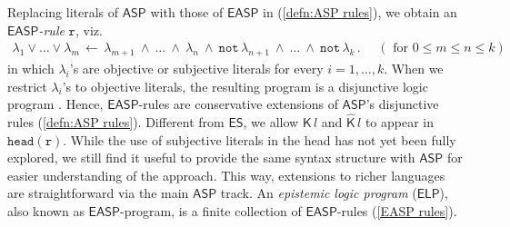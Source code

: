 \documentclass[submission,copyright,creativecommons]{eptcs}
\newcommand{\logic}[1]  { \ensuremath{\mathsf{#1}} }
\newcommand{\ASP}  { \logic{ASP} }
\newcommand{\ES}  { \logic{ES} }
\newcommand{\EASP}  { \logic{EASP} }
\newcommand{\ELP}  { \logic{ELP} }
\newcommand{\lpnot}  { \mathtt{not} \, }
\newcommand{\K}  { \mathsf{K} }
\newcommand{\Khat}  { \hat{\mathsf{K}} }
\begin{document}
Replacing literals of $\ASP$ with those of $\EASP$ in (\ref{defn:ASP rules}), we obtain
an \emph{$\EASP$-rule} $\mathtt{r}$, viz.\ 
\begin{align} \label{EASP rules}
\lambda_1 \lor \ldots \lor \lambda_m \,\leftarrow\, 
\lambda_{m+1} ~\land~ \ldots ~\land~ \lambda_n ~\land~
\lpnot \lambda_{n+1} ~\land~ \ldots ~\land~ \lpnot \lambda_k\,. ~~~~~~
(\text{ for } 0 \leq m \leq n \leq k)
\end{align}
in which $\lambda_i$'s are objective or subjective literals for every $i=1,\ldots,k$.
When we restrict $\lambda_i$'s to objective literals, the resulting program 
is a disjunctive logic program \cite{GelfondL91}.
Hence, $\EASP$-rules are conservative extensions of $\ASP$'s disjunctive rules (\ref{defn:ASP rules}).
Different from $\ES$, we allow $\K\,l$ and $\Khat\,l$ to appear in $\mathtt{head(r)}$.
While the use of subjective literals in the head has not yet been fully explored, we still 
find it useful to provide the same syntax structure with $\ASP$
for easier understanding of the approach. This way, extensions to richer
languages are straightforward via the main $\ASP$ track.
%
An \emph{epistemic logic program} ($\ELP$), also known as $\EASP$-program, is a finite collection of $\EASP$-rules (\ref{EASP rules}). 

\end{document}
